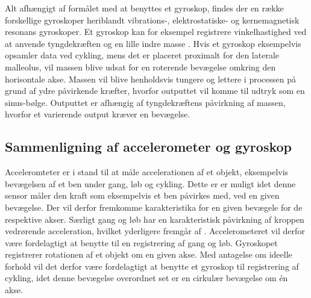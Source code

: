 Alt afhængigt af formålet med at benyttes et gyroskop, findes der en række forskellige gyroskoper heriblandt vibrations-, elektrostatiske- og kernemagnetisk resonans gyroskoper. \citep{LuingeVeltink2005,TittertonWeston2004} Et gyroskop kan for eksempel registrere vinkelhastighed ved at anvende tyngdekræften og en lille indre masse \citep{Sparkfun_gyro,Barbour2014}. Hvis et gyroskop eksempelvis opsamler data ved cykling, mens det er placeret proximalt for den laterale malleolus, vil massen blive udsat for en roterende bevægelse omkring den horisontale akse. Massen vil blive henholdsvis tungere og lettere i processen på grund af ydre påvirkende kræfter, hvorfor outputtet vil komme til udtryk som en sinus-bølge. Outputtet er afhængig af tyngdekræftens påvirkning af massen, hvorfor et varierende output kræver en bevægelse.%
%
\subsection{Sammenligning af accelerometer og gyroskop}
Acceleromteter er i stand til at måle accelerationen af et objekt, eksempelvis bevægelsen af et ben under gang, løb og cykling. Dette er er muligt idet denne sensor måler den kraft som eksempelvis et ben påvirkes med, ved en given bevægelse. Der vil derfor fremkomme karakteristika for en given bevægele for de respektive akser. Særligt gang og løb har en karakteristisk påvirkning af kroppen vedrørende acceleration, hvilket yderligere fremgår af . Accelerometeret vil derfor være fordelagtigt at benytte til en registrering af gang og løb. Gyroskopet registrerer rotationen af et objekt om en given akse. Med antagelse om ideelle forhold vil det derfor være fordelagtigt at benytte et gyroskop til registrering af cykling, idet denne bevægelse overordnet set er en cirkulær bevægelse om én akse. \\ 


